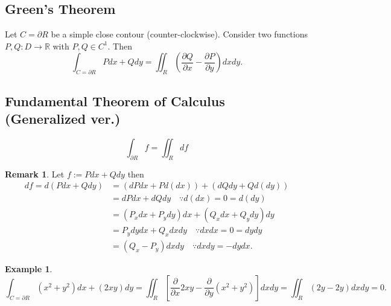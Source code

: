 \documentclass[12pt,openany]{book}
\theoremstyle{definition}
\newtheorem{remark}{Remark}[section]
\newtheorem{example}{Example}[section]
\newcommand{\R}{\mathbb{R}}
\newcommand{\of}[1]{\left( #1 \right)}
\begin{document}
	\subsection{Green's Theorem}
	Let $C=\partial R$ be a simple close contour (counter-clockwise). Consider two functions $P,Q:D\to\R$ with $P,Q\in C^1$. Then \[
	\int_{C=\partial R} Pdx+Qdy=\iint_R\of{\frac{\partial Q}{\partial x}-\frac{\partial P}{\partial y}}dxdy.
	\]
	\vspace{8pt}
	\subsection{Fundamental Theorem of Calculus (Generalized ver.)}
	\[
	\boxed{\int_{\partial R}f=\iint_R df}
	\]
	\vspace{4pt}
	\begin{remark}
		Let $f:=Pdx+Qdy$ then \begin{align*}
		df=d\of{Pdx+Qdy}&=(dPdx+Pd(dx))+(dQdy+Qd(dy))\\
		&=dPdx+dQdy\quad\because d(dx)=0=d(dy)\\
		&=\of{P_xdx+P_ydy}dx+\of{Q_xdx+Q_ydy}dy\\
		&=P_ydydx+Q_xdxdy\quad\because dxdx=0=dydy\\
		&=\of{Q_x-P_y}dxdy\quad\because dxdy=-dydx.
		\end{align*}
	\end{remark}
	\vspace{4pt}
	\begin{example}
		\[
		\int_{C=\partial R}\of{x^2+y^2}dx+\of{2xy}dy=\iint_R\left[\frac{\partial}{\partial x}2xy-\frac{\partial}{\partial y}\of{x^2+y^2}\right]dxdy=\iint_R\of{2y-2y}dxdy=0.
		\]
	\end{example}
	
\end{document}

